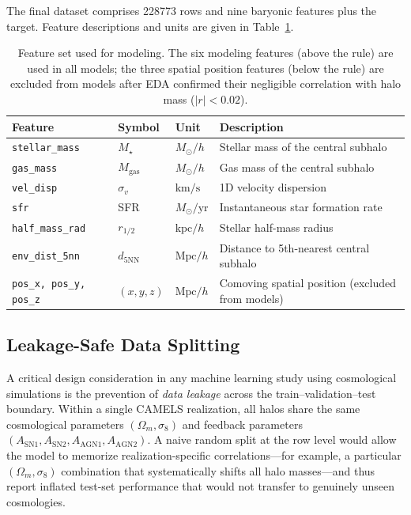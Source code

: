 \documentclass[12pt, a4paper]{article}
\newcommand{\Msun}{M_\odot}
\newcommand{\sigmav}{\sigma_v}
\newcommand{\Mstar}{M_\star}
\begin{document}
The final dataset comprises \num{228773} rows and nine baryonic features plus the target.  Feature descriptions and units are given in Table~\ref{tab:features}.

\begin{table}[H]
  \centering
  \caption{Feature set used for modeling.  The six modeling features (above the rule) are used in all models; the three spatial position features (below the rule) are excluded from models after EDA confirmed their negligible correlation with halo mass ($|r| < 0.02$).}
  \label{tab:features}
  \begin{tabular}{@{}llll@{}}
    \toprule
    Feature & Symbol & Unit & Description \\
    \midrule
    \texttt{stellar\_mass}   & $\Mstar$     & $\Msun/h$       & Stellar mass of the central subhalo \\
    \texttt{gas\_mass}       & $M_\mathrm{gas}$      & $\Msun/h$       & Gas mass of the central subhalo \\
    \texttt{vel\_disp}       & $\sigmav$    & $\mathrm{km/s}$ & 1D velocity dispersion \\
    \texttt{sfr}             & SFR          & $\Msun/\mathrm{yr}$ & Instantaneous star formation rate \\
    \texttt{half\_mass\_rad} & $r_{1/2}$    & $\mathrm{kpc}/h$     & Stellar half-mass radius \\
    \texttt{env\_dist\_5nn}  & $d_{5\mathrm{NN}}$  & $\mathrm{Mpc}/h$     & Distance to 5th-nearest central subhalo \\
    \midrule
    \texttt{pos\_x, pos\_y, pos\_z} & $(x,y,z)$ & $\mathrm{Mpc}/h$ & Comoving spatial position (excluded from models) \\
    \bottomrule
  \end{tabular}
\end{table}

\subsection{Leakage-Safe Data Splitting}
\label{sec:splitting}

A critical design consideration in any machine learning study using cosmological simulations is the prevention of \emph{data leakage} across the train--validation--test boundary.  Within a single CAMELS realization, all halos share the same cosmological parameters $(\Omega_m, \sigma_8)$ and feedback parameters $(A_\mathrm{SN1}, A_\mathrm{SN2}, A_\mathrm{AGN1}, A_\mathrm{AGN2})$.  A naive random split at the row level would allow the model to memorize realization-specific correlations---for example, a particular $(\Omega_m, \sigma_8)$ combination that systematically shifts all halo masses---and thus report inflated test-set performance that would not transfer to genuinely unseen cosmologies.
\end{document}
